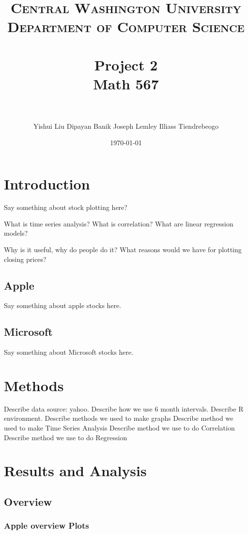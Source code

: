 \documentclass[paper=a4, fontsize=11pt]{scrartcl} %
\title{	
\normalfont \normalsize 
\textsc{Central Washington University\\ Department of Computer Science} \\ [25pt] %
\horrule{0.5pt} \\[0.4cm] %
\huge Project 2 \\ Math 567  \\ %
\horrule{2pt} \\[0.5cm] %
}
\author{ {Yishui Liu}  \hspace{.8cm} {Dipayan Banik} \hspace{.8cm} {Joseph Lemley} \hspace{.8cm}  {Illiass Tiendrebeogo} } %
\date{\vspace{.3cm} \normalsize\today} %
\numberwithin{equation}{section} %
\numberwithin{figure}{section} %
\numberwithin{table}{section} %
\begin{document}
\maketitle %
\setcounter{tocdepth}{2}
\tableofcontents

\section{Introduction}

Say something about stock plotting here? 


What is time series analysis?
What is correlation?
What are linear regression models?

Why is it useful, why do people do it? 
What reasons would we have for plotting closing prices?



\subsection{Apple}
Say something about apple stocks here. 
\subsection{Microsoft}
Say something about Microsoft stocks here. 
\section{Methods}

Describe data source: yahoo. 
Describe how we use 6 month intervals. 
Describe R environment. 
Describe methods we used to make graphs
Describe method we used to make Time Series Analysis
Describe method we use to do Correlation
Describe method we use to do Regression

\section{Results and Analysis}

\subsection{Overview}

\subsubsection{Apple overview Plots}
\end{document}
